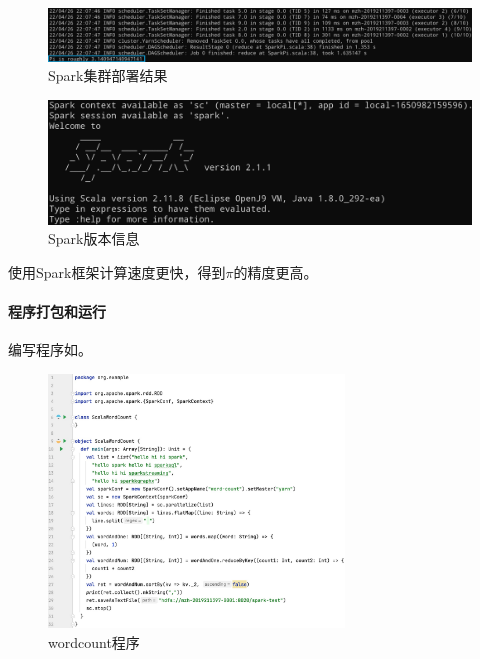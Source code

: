 \documentclass[lang=cn,11pt,a4paper,cite=authornum]{paper}
\begin{document}
\begin{figure}[!htb]
    \centering
    \includegraphics[width=\textwidth]{./images/spark1.jpg}
    \caption{Spark集群部署结果\label{fig:spark1}}
\end{figure}

\begin{figure}[!htb]
    \centering
    \includegraphics[width=\textwidth]{./images/spark2.jpg}
    \caption{Spark版本信息\label{fig:spark2}}
\end{figure}

使用Spark框架计算速度更快，得到$\pi$的精度更高。

\paragraph{程序打包和运行}

编写程序如。

\begin{figure}[!htb]
    \centering
    \includegraphics[width=0.7\textwidth]{./images/code1.jpg}
    \caption{wordcount程序\label{fig:code1}}
\end{figure}
\end{document}
